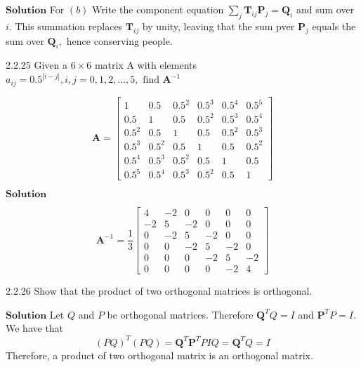 \documentclass{styles/kaobook}
\begin{document}
$\boxed{\textbf{Solution}}$ For $(b)$ Write the component equation $\sum_{j} \mathbf{T}_{i j} \mathbf{P}_{j}=\mathbf{Q}_{i}$ and sum over $i.$ This summation replaces $\mathbf{T}_{i j}$ by unity, leaving that the sum pver $\mathbf{P}_{j}$ equals the sum over $\mathbf{Q}_{i},$ hence conserving people.



\begin{greenbox}{2.2.25}
Given a $6 \times 6$ matrix A with elements $a_{i j}=0.5^{|i-j|}, i, j=0,1,2, \ldots, 5, \text { find } \mathbf{A}^{-1}$

$$\mathbf{A}=\begin{bmatrix}
1 & 0.5 & 0.5^2 & 0.5^3 & 0.5^4 & 0.5^5 \\ 
0.5 & 1 & 0.5 & 0.5^2 & 0.5^3 & 0.5^4 \\ 
0.5^2 & 0.5 & 1 & 0.5 & 0.5^2 & 0.5^3\\ 
0.5^3 & 0.5^2 & 0.5 & 1 & 0.5 & 0.5^2\\ 
0.5^4 & 0.5^3 & 0.5^2 & 0.5 & 1 & 0.5\\ 
0.5^5 & 0.5^4 & 0.5^3 & 0.5^2 & 0.5 & 1
\end{bmatrix}$$
\end{greenbox}

$\boxed{\textbf{Solution}}$

$$\mathbf{A}^{-1}=\frac{1}{3}\begin{bmatrix}{4} & {-2} & {0} & {0} & {0} & {0} \\ {-2} & {5} & {-2} & {0} & {0} & {0} \\ {0} & {-2} & {5} & {-2} & {0} & {0} \\ {0} & {0} & {-2} & {5} & {-2} & {0} \\ {0} & {0} & {0} & {-2} & {5} & {-2} \\ {0} & {0} & {0} & {0} & {-2} & {4}\end{bmatrix}$$









\begin{greenbox}{2.2.26}
Show that the product of two orthogonal matrices is orthogonal.
\end{greenbox}



$\boxed{\textbf{Solution}}$ Let $Q$ and $P$ be orthogonal matrices. Therefore $\mathbf{Q}^{T} Q=I$ and $\mathbf{P}^{T} P=I .$
We have that
$$
(P Q)^{T}(P Q)=\mathbf{Q}^{T} \mathbf{P}^{T} P I Q=\mathbf{Q}^{T} Q=I
$$
Therefore, a product of two orthogonal matrix is an orthogonal matrix.
\end{document}
